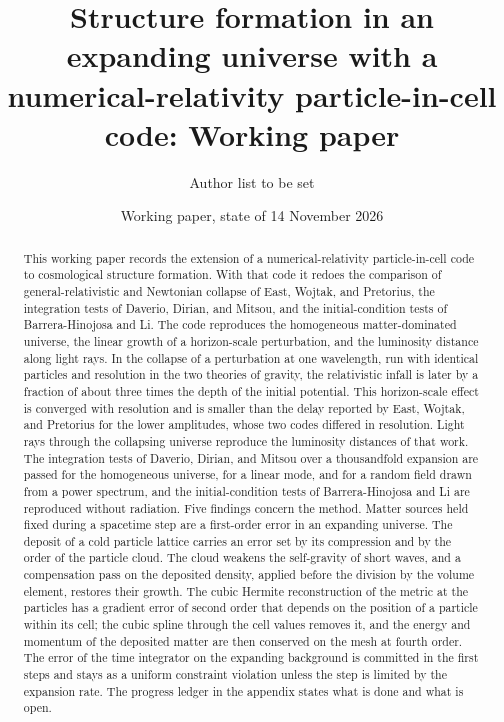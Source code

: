 \documentclass[aps,prd,twocolumn,10pt,superscriptaddress,nofootinbib,longbibliography,floatfix]{revtex4-2}
\begin{document}
\title{Structure formation in an expanding universe with a numerical-relativity particle-in-cell code: Working paper}

\author{Author list to be set}

\date{Working paper, state of 14 November 2026}

\begin{abstract}
This working paper records the extension of a numerical-relativity particle-in-cell code to cosmological structure formation. With that code it redoes the comparison of general-relativistic and Newtonian collapse of East, Wojtak, and Pretorius, the integration tests of Daverio, Dirian, and Mitsou, and the initial-condition tests of Barrera-Hinojosa and Li. The code reproduces the homogeneous matter-dominated universe, the linear growth of a horizon-scale perturbation, and the luminosity distance along light rays. In the collapse of a perturbation at one wavelength, run with identical particles and resolution in the two theories of gravity, the relativistic infall is later by a fraction of about three times the depth of the initial potential. This horizon-scale effect is converged with resolution and is smaller than the delay reported by East, Wojtak, and Pretorius for the lower amplitudes, whose two codes differed in resolution. Light rays through the collapsing universe reproduce the luminosity distances of that work. The integration tests of Daverio, Dirian, and Mitsou over a thousandfold expansion are passed for the homogeneous universe, for a linear mode, and for a random field drawn from a power spectrum, and the initial-condition tests of Barrera-Hinojosa and Li are reproduced without radiation. Five findings concern the method. Matter sources held fixed during a spacetime step are a first-order error in an expanding universe. The deposit of a cold particle lattice carries an error set by its compression and by the order of the particle cloud. The cloud weakens the self-gravity of short waves, and a compensation pass on the deposited density, applied before the division by the volume element, restores their growth. The cubic Hermite reconstruction of the metric at the particles has a gradient error of second order that depends on the position of a particle within its cell; the cubic spline through the cell values removes it, and the energy and momentum of the deposited matter are then conserved on the mesh at fourth order. The error of the time integrator on the expanding background is committed in the first steps and stays as a uniform constraint violation unless the step is limited by the expansion rate. The progress ledger in the appendix states what is done and what is open.
\end{abstract}
\end{document}
